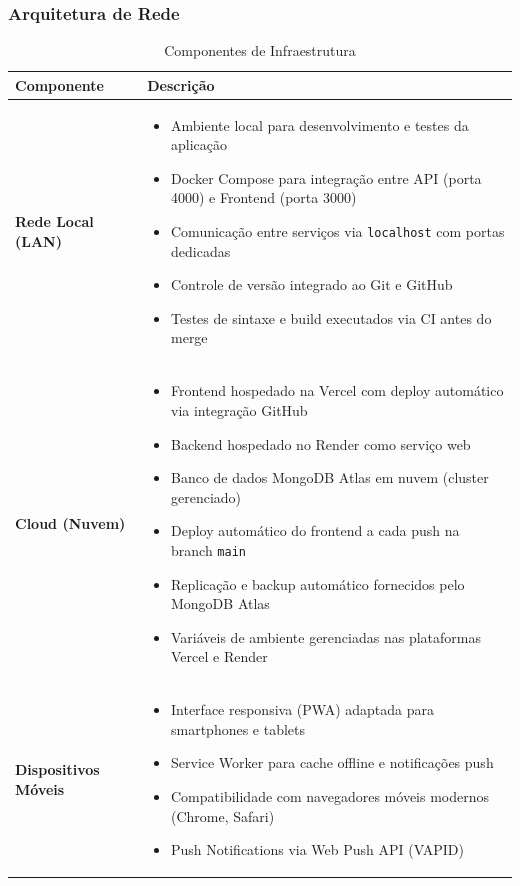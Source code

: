 \documentclass[11pt,a4paper]{article}
\begin{document}
\subsubsection{Arquitetura de Rede}
\begin{table}[H]
\centering
\caption{Componentes de Infraestrutura}
\label{tab:infrastructure}
\begin{tabular}{|l|p{10cm}|}
\hline
\textbf{Componente} & \textbf{Descrição} \\
\hline
\textbf{Rede Local (LAN)} & 
\begin{itemize}[leftmargin=*, nosep]
    \item Ambiente local para desenvolvimento e testes da aplicação
    \item Docker Compose para integração entre API (porta 4000) e Frontend (porta 3000)
    \item Comunicação entre serviços via \texttt{localhost} com portas dedicadas
    \item Controle de versão integrado ao Git e GitHub
    \item Testes de sintaxe e build executados via CI antes do merge
\end{itemize} \\
\hline
\textbf{Cloud (Nuvem)} & 
\begin{itemize}[leftmargin=*, nosep]
    \item Frontend hospedado na Vercel com deploy automático via integração GitHub
    \item Backend hospedado no Render como serviço web
    \item Banco de dados MongoDB Atlas em nuvem (cluster gerenciado)
    \item Deploy automático do frontend a cada push na branch \texttt{main}
    \item Replicação e backup automático fornecidos pelo MongoDB Atlas
    \item Variáveis de ambiente gerenciadas nas plataformas Vercel e Render
\end{itemize} \\
\hline
\textbf{Dispositivos Móveis} & 
\begin{itemize}[leftmargin=*, nosep]
    \item Interface responsiva (PWA) adaptada para smartphones e tablets
    \item Service Worker para cache offline e notificações push
    \item Compatibilidade com navegadores móveis modernos (Chrome, Safari)
    \item Push Notifications via Web Push API (VAPID)

\end{itemize}
\end{tabular}
\end{table}
\end{document}
